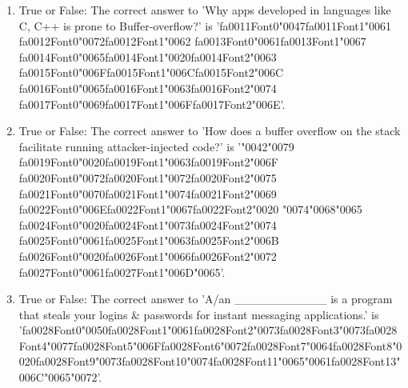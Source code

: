 \documentclass[12pt]{article}
\begin{document}
\begin{enumerate}[label=\arabic*.]
\item True or False: The correct answer to 'Why apps developed in languages like C, C++ is prone to Buffer-overflow?' is '{\csname fa0011Font0\endcsname\char"0047}{\csname fa0011Font1\endcsname\char"0061} {\csname fa0012Font0\endcsname\char"0072}{\csname fa0012Font1\endcsname\char"0062} {\csname fa0013Font0\endcsname\char"0061}{\csname fa0013Font1\endcsname\char"0067} {\csname fa0014Font0\endcsname\char"0065}{\csname fa0014Font1\endcsname\char"0020}{\csname fa0014Font2\endcsname\char"0063} {\csname fa0015Font0\endcsname\char"006F}{\csname fa0015Font1\endcsname\char"006C}{\csname fa0015Font2\endcsname\char"006C} {\csname fa0016Font0\endcsname\char"0065}{\csname fa0016Font1\endcsname\char"0063}{\csname fa0016Font2\endcsname\char"0074} {\csname fa0017Font0\endcsname\char"0069}{\csname fa0017Font1\endcsname\char"006F}{\csname fa0017Font2\endcsname\char"006E}'.
\item True or False: The correct answer to 'How does a buffer overflow on the stack facilitate running attacker-injected code?' is '{\char"0042}{\char"0079} {\csname fa0019Font0\endcsname\char"0020}{\csname fa0019Font1\endcsname\char"0063}{\csname fa0019Font2\endcsname\char"006F} {\csname fa0020Font0\endcsname\char"0072}{\csname fa0020Font1\endcsname\char"0072}{\csname fa0020Font2\endcsname\char"0075} {\csname fa0021Font0\endcsname\char"0070}{\csname fa0021Font1\endcsname\char"0074}{\csname fa0021Font2\endcsname\char"0069} {\csname fa0022Font0\endcsname\char"006E}{\csname fa0022Font1\endcsname\char"0067}{\csname fa0022Font2\endcsname\char"0020} {\char"0074}{\char"0068}{\char"0065} {\csname fa0024Font0\endcsname\char"0020}{\csname fa0024Font1\endcsname\char"0073}{\csname fa0024Font2\endcsname\char"0074} {\csname fa0025Font0\endcsname\char"0061}{\csname fa0025Font1\endcsname\char"0063}{\csname fa0025Font2\endcsname\char"006B} {\csname fa0026Font0\endcsname\char"0020}{\csname fa0026Font1\endcsname\char"0066}{\csname fa0026Font2\endcsname\char"0072} {\csname fa0027Font0\endcsname\char"0061}{\csname fa0027Font1\endcsname\char"006D}{\char"0065}'.
\item True or False: The correct answer to 'A/an \_\_\_\_\_\_\_\_\_\_\_ is a program that steals your logins \& passwords for instant messaging applications.' is '{\csname fa0028Font0\endcsname\char"0050}{\csname fa0028Font1\endcsname\char"0061}{\csname fa0028Font2\endcsname\char"0073}{\csname fa0028Font3\endcsname\char"0073}{\csname fa0028Font4\endcsname\char"0077}{\csname fa0028Font5\endcsname\char"006F}{\csname fa0028Font6\endcsname\char"0072}{\csname fa0028Font7\endcsname\char"0064}{\csname fa0028Font8\endcsname\char"0020}{\csname fa0028Font9\endcsname\char"0073}{\csname fa0028Font10\endcsname\char"0074}{\csname fa0028Font11\endcsname\char"0065}{\char"0061}{\csname fa0028Font13\endcsname\char"006C}{\char"0065}{\char"0072}'.

\end{enumerate}
\end{document}
